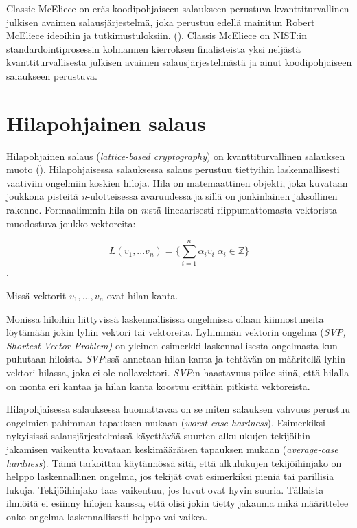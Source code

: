 Classic McEliece on eräs koodipohjaiseen salaukseen perustuva kvanttiturvallinen julkisen avaimen salausjärjestelmä, joka perustuu edellä mainitun Robert McEliece ideoihin ja tutkimustuloksiin. (\cite{alagic2020status}). Classis McEliece on NIST:in standardointiprosessin kolmannen kierroksen finalisteista yksi neljästä kvanttiturvallisesta julkisen avaimen salausjärjestelmästä ja ainut koodipohjaiseen salaukseen perustuva.

\section{Hilapohjainen salaus}
Hilapohjainen salaus (\emph{lattice-based cryptography}) on kvanttiturvallinen salauksen muoto (\cite{regev2006lattice}). Hilapohjaisessa salauksessa salaus perustuu tiettyihin laskennallisesti vaativiin ongelmiin koskien hiloja. Hila on matemaattinen objekti, joka kuvataan joukkona pisteitä \emph{n}-ulotteisessa avaruudessa ja sillä on jonkinlainen jaksollinen rakenne. Formaalimmin hila on \emph{n}:stä lineaarisesti riippumattomasta vektorista muodostuva joukko vektoreita: 

\[L(v_1,...v_n) =\Bigg\{ {\sum_{i=1}^{n}\alpha_i 
v_i|\alpha_i \in \mathbb{Z}} \Bigg\}\]. 

Missä vektorit $v_1,...,v_n$ ovat hilan kanta.

Monissa hiloihin liittyvissä 
laskennallisissa ongelmissa ollaan kiinnostuneita löytämään jokin lyhin vektori tai vektoreita. Lyhimmän vektorin ongelma (\emph{SVP, Shortest Vector Problem)} on yleinen esimerkki laskennallisesta ongelmasta kun puhutaan hiloista. \emph{SVP}:ssä annetaan hilan kanta ja tehtävän on määritellä lyhin vektori hilassa, joka ei ole nollavektori. \emph{SVP}:n haastavuus piilee siinä, että hilalla on monta eri kantaa ja hilan kanta koostuu erittäin pitkistä vektoreista.

Hilapohjaisessa salauksessa huomattavaa on se miten salauksen vahvuus perustuu ongelmien pahimman tapauksen mukaan (\emph{worst-case hardness}). Esimerkiksi nykyisissä salausjärjestelmissä käyettävää suurten alkulukujen tekijöihin jakamisen vaikeutta kuvataan keskimääräisen tapauksen mukaan (\emph{average-case hardness}). Tämä tarkoittaa käytännössä sitä, että alkulukujen tekijöihinjako on helppo laskennallinen ongelma, jos tekijät ovat esimerkiksi pieniä tai parillisia lukuja. Tekijöihinjako taas vaikeutuu, jos luvut ovat hyvin suuria. Tällaista ilmiöitä ei esiinny hilojen kanssa, että olisi jokin tietty jakauma mikä määrittelee onko ongelma laskennallisesti helppo vai vaikea.

